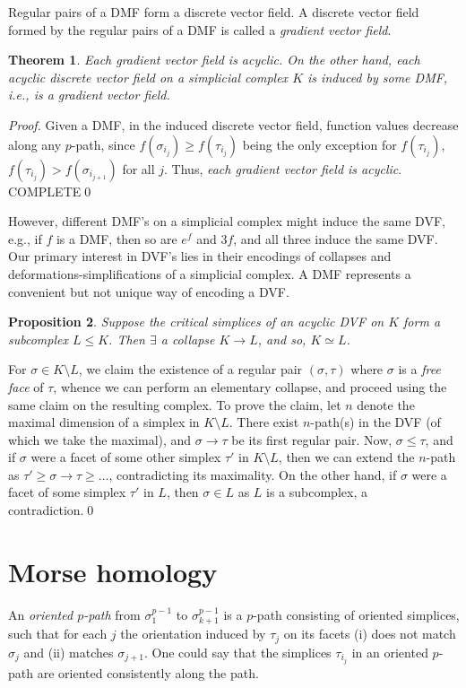 \documentclass[a4paper,11pt, tikz]{article}
\newcommand{\lb}{\left(}
\newcommand{\rb}{\right)}
\renewcommand{\t}{\tau}
\newcommand{\s}{\sigma}
\newcommand{\tends}{\rightarrow}
\newtheorem{thm}{Theorem}
\newtheorem{prop}[thm]{Proposition}
\begin{document}
Regular pairs of a DMF form a discrete vector field. A discrete vector field formed by the regular pairs of a DMF is called a \emph{gradient vector field}.

\begin{thm}
Each gradient vector field is acyclic. On the other hand, each acyclic discrete vector field on a simplicial complex $K$ is induced by some DMF, i.e., is a gradient vector field.
\end{thm}
\noindent{}\emph{Proof.} Given a DMF, in the induced discrete vector field, function values decrease along any $p$-path, since $f\lb \s_{i_j}\rb\geq f\lb \t_{i_j}\rb$ being the only exception for $f\lb \t_{i_j}\rb$, $f\lb \t_{i_j}\rb>f\lb \s_{i_{j+1}}\rb$ for all $j$. Thus, \emph{each gradient vector field is acyclic}. COMPLETE\qed

However, different DMF's on a simplicial complex might induce the same DVF, e.g., if $f$ is a DMF, then so are $e^f$ and $3f$, and all three induce the same DVF. Our primary interest in DVF's lies in their encodings of collapses and deformations-simplifications of a simplicial complex. A DMF represents a convenient but not unique way of encoding a DVF.
\begin{prop}
Suppose the critical simplices of an acyclic DVF on $K$ form a subcomplex $L\leq K$. Then $\exists$ a collapse $K\tends L$, and so, $K\simeq L$.
\end{prop}
\noindent{}For $\s\in K\setminus L$, we claim the existence of a regular pair $\lb \s,\t\rb$ where $\s$ is a \emph{free face} of $\t$, whence we can perform an elementary collapse, and proceed using the same claim on the resulting complex. To prove the claim, let $n$ denote the maximal dimension of a simplex in $K\setminus L$. There exist $n$-path(s) in the DVF (of which we take the maximal), and $\s\tends\t$ be its first regular pair. Now, $\s\leq \t$, and if $\s$ were a facet of some other simplex $\t'$ in $K\setminus L$, then we can extend the $n$-path as $\t'\geq \s\tends\t\geq\dots$, contradicting its maximality. On the other hand, if $\s$ were a facet of some simplex $\t'$ in $L$, then $\s\in L$ as $L$ is a subcomplex, a contradiction.\qed
\section{Morse homology}
\noindent{}An \emph{oriented $p$-path} from $\s_1^{p-1}$ to $\s_{k+1}^{p-1}$ is a $p$-path consisting of oriented simplices, such that for each $j$ the orientation induced by $\t_j$ on its facets (i) does not match $\s_j$ and (ii) matches $\s_{j+1}$. One could say that the simplices $\t_{i_j}$ in an oriented $p$-path are oriented consistently along the path.
\end{document}
